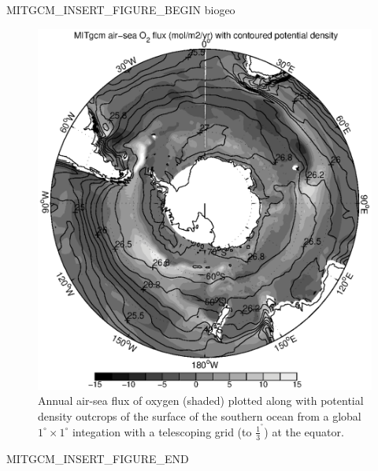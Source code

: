 \begin{rawhtml}MITGCM_INSERT_FIGURE_BEGIN biogeo\end{rawhtml}
\begin{figure}
\begin{center}
   \includegraphics*[width=\textwidth,trim=30 0 0 0]{s_overview/figs/polar.ps}
\end{center}
\caption{Annual air-sea flux of oxygen (shaded) plotted along with
potential density outcrops of the surface of the southern ocean from a
global $1^{\circ}\times 1^{\circ}$ integation with a telescoping
grid (to $\frac{1}{3}^{^\circ}$) at the equator.}
\label{fig:biogeo}
\end{figure}
\begin{rawhtml}MITGCM_INSERT_FIGURE_END\end{rawhtml}

